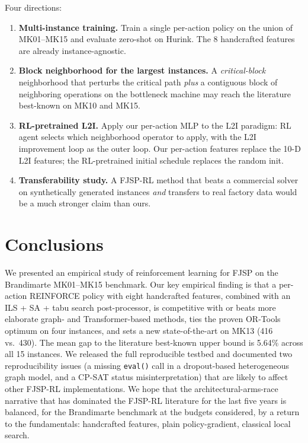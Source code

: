 \documentclass[preprint,review,3p,times,twocolumn]{elsarticle}
\begin{document}
Four directions:
\begin{enumerate}[leftmargin=*]
  \item \textbf{Multi-instance training.} Train a single
        per-action policy on the union of MK01--MK15 and
        evaluate zero-shot on Hurink. The 8 handcrafted
        features are already instance-agnostic.
  \item \textbf{Block neighborhood for the largest
        instances.} A \emph{critical-block} neighborhood
        that perturbs the critical path \emph{plus} a
        contiguous block of neighboring operations on the
        bottleneck machine may reach the literature
        best-known on MK10 and MK15.
  \item \textbf{RL-pretrained L2I.} Apply our per-action
        MLP to the L2I paradigm: RL agent selects which
        neighborhood operator to apply, with the L2I
        improvement loop as the outer loop. Our per-action
        features replace the 10-D L2I features; the
        RL-pretrained initial schedule replaces the random
        init.
  \item \textbf{Transferability study.} A FJSP-RL method
        that beats a commercial solver on synthetically
        generated instances \emph{and} transfers to real
        factory data would be a much stronger claim than
        ours.
\end{enumerate}

\section{Conclusions}
\label{sec:conclusion}

We presented an empirical study of reinforcement learning
for FJSP on the Brandimarte MK01--MK15 benchmark. Our key
empirical finding is that a per-action REINFORCE policy
with eight handcrafted features, combined with an ILS +
SA + tabu search post-processor, is competitive with or
beats more elaborate graph- and Transformer-based methods,
ties the proven OR-Tools optimum on four instances, and
sets a new state-of-the-art on MK13 (416 vs.\ 430). The
mean gap to the literature best-known upper bound is
5.64\% across all 15 instances. We released the full
reproducible testbed and documented two reproducibility
issues (a missing \texttt{eval()} call in a dropout-based
heterogeneous graph model, and a CP-SAT status
misinterpretation) that are likely to affect other
FJSP-RL implementations. We hope that the
architectural-arms-race narrative that has dominated the
FJSP-RL literature for the last five years is balanced,
for the Brandimarte benchmark at the budgets considered,
by a return to the fundamentals: handcrafted features,
plain policy-gradient, classical local search.
\end{document}
